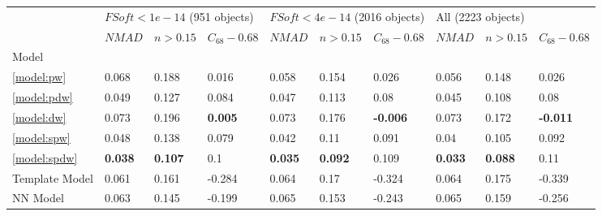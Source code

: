 \documentclass[fleqn,usenatbib]{mnras}
\begin{document}
\begin{table}
	\begin{tabular}{llllllllll}
            \hline
            {} & \multicolumn{3}{l}{$FSoft < 1e-14$ (951 objects)} & \multicolumn{3}{l}{$FSoft < 4e-14$ (2016 objects)} & \multicolumn{3}{l}{All (2223 objects)} \\
            {} &                        $NMAD$ &        $n>0.15$ & $C_{68} - 0.68$ &                         $NMAD$ &        $n>0.15$ &  $C_{68} - 0.68$ &                       $NMAD$ &        $n>0.15$ &  $C_{68} - 0.68$ \\
            Model            &                               &                 &                 &                                &                 &                  &                              &                 &                  \\
            \hline
            \ref{model:pw}   &                         0.068 &           0.188 &           0.016 &                          0.058 &           0.154 &            0.026 &                        0.056 &           0.148 &            0.026 \\
            \ref{model:pdw}  &                         0.049 &           0.127 &           0.084 &                          0.047 &           0.113 &             0.08 &                        0.045 &           0.108 &             0.08 \\
            \ref{model:dw}   &                         0.073 &           0.196 &  \textbf{0.005} &                          0.073 &           0.176 &  \textbf{-0.006} &                        0.073 &           0.172 &  \textbf{-0.011} \\
            \ref{model:spw}  &                         0.048 &           0.138 &           0.079 &                          0.042 &            0.11 &            0.091 &                         0.04 &           0.105 &            0.092 \\
            \ref{model:spdw} &                \textbf{0.038} &  \textbf{0.107} &             0.1 &                 \textbf{0.035} &  \textbf{0.092} &            0.109 &               \textbf{0.033} &  \textbf{0.088} &             0.11 \\
            Template Model   &                         0.061 &           0.161 &          -0.284 &                          0.064 &            0.17 &           -0.324 &                        0.064 &           0.175 &           -0.339 \\
            NN Model         &                         0.063 &           0.145 &          -0.199 &                          0.065 &           0.153 &           -0.243 &                        0.065 &           0.159 &           -0.256 \\

\end{tabular}
\end{table}
\end{document}
